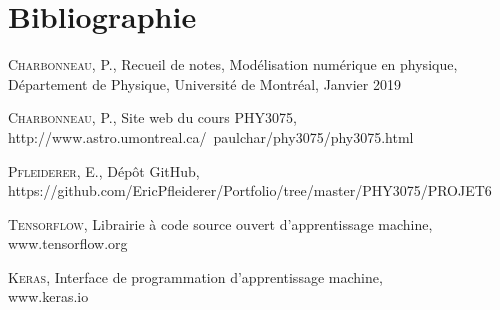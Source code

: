 \documentclass{article}
\begin{document}
\section{Bibliographie}\label{sec:bibliographie}
\begin{thebibliography}{l}
	\textsc{Charbonneau}, P., Recueil de notes, Modélisation numérique en physique, Département de Physique, Université de Montréal, Janvier 2019
	
	\textsc{Charbonneau}, P., Site web du cours PHY3075, \\ http://www.astro.umontreal.ca/~paulchar/phy3075/phy3075.html
	
	\textsc{Pfleiderer}, E., Dépôt GitHub,\\ https://github.com/EricPfleiderer/Portfolio/tree/master/PHY3075/PROJET6
	
	\textsc{Tensorflow}, Librairie à code source ouvert d'apprentissage machine,\\
	www.tensorflow.org
	
	\textsc{Keras}, Interface de programmation d'apprentissage machine,\\
	www.keras.io
	
\end{thebibliography}
\end{document}
